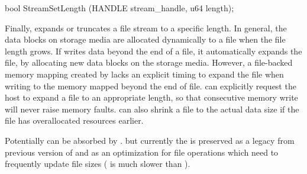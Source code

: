 







\begin{paldef}
bool StreamSetLength (HANDLE stream_handle, u64 length);
\end{paldef}


Finally,  expands or truncates a file stream to a specific length.
In general, the data blocks on storage media are allocated dynamically
to a file when the file length grows.
If  writes data beyond the end of a file, it automatically expands the file, by allocating new data blocks on the storage media.
However, a file-backed memory mapping created by 
lacks an explicit timing to expand the file
when writing to the memory mapped beyond the end of file.
 can explicitly request the host to expand a file to an appropriate length,
so that consecutive memory write will never raise memory faults.
 can also shrink a file to the actual data size
if the file has overallocated resources earlier.


Potentially  can be absorbed by . but currently the \hostapi{} is preserved as a legacy from previous version of \thehostabi{} and as an optimization for file operations which need to frequently update file sizes ( is much slower than ).







